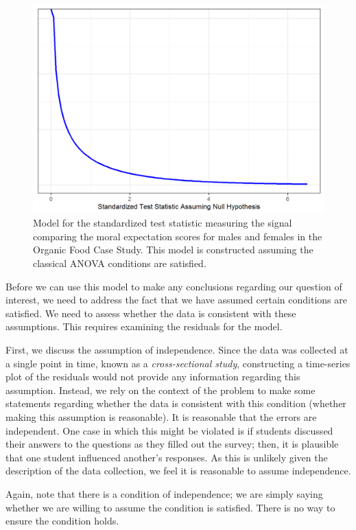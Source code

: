 \documentclass[
]{book}
\theoremstyle{plain}
\theoremstyle{mydefn}
\theoremstyle{myexmpl}
\theoremstyle{remark}
\begin{document}
\begin{figure}

{\centering \includegraphics[width=0.8\linewidth]{./Images/anovarecap-classical-null-model-1} 

}

\caption{Model for the standardized test statistic measuring the signal comparing the moral expectation scores for males and females in the Organic Food Case Study.  This model is constructed assuming the classical ANOVA conditions are satisfied.}\label{fig:anovarecap-classical-null-model}
\end{figure}

Before we can use this model to make any conclusions regarding our question of interest, we need to address the fact that we have assumed certain conditions are satisfied. We need to assess whether the data is consistent with these assumptions. This requires examining the residuals for the model.

First, we discuss the assumption of independence. Since the data was collected at a single point in time, known as a \emph{cross-sectional study}, constructing a time-series plot of the residuals would not provide any information regarding this assumption. Instead, we rely on the context of the problem to make some statements regarding whether the data is consistent with this condition (whether making this assumption is reasonable). It is reasonable that the errors are independent. One case in which this might be violated is if students discussed their answers to the questions as they filled out the survey; then, it is plausible that one student influenced another's responses. As this is unlikely given the description of the data collection, we feel it is reasonable to assume independence.

Again, note that there is a condition of independence; we are simply saying whether we are willing to assume the condition is satisfied. There is no way to ensure the condition holds.
\end{document}
